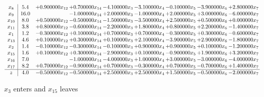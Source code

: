 \documentclass[10pt]{article}
\begin{document}
 \[\begin{array}{c| c c@{\hskip 2pt} c@{\hskip 2pt} c@{\hskip 2pt} c@{\hskip 2pt} c@{\hskip 2pt} c@{\hskip 2pt} c@{\hskip 2pt} }
 x_{8}   &  5.4 & + 0.900000 x_{12} & + 0.700000 x_{14} & -4.100000 x_{3} & -3.100000 x_{4} & -0.100000 x_{5} & -3.900000 x_{6} & + 2.800000 x_{7}\\
 x_{9}   &  16.0  &   & -1.000000 x_{14} & + 2.000000 x_{3} & -1.000000 x_{4} & + 2.000000 x_{5} & + 3.000000 x_{6} & -6.000000 x_{7}\\
 x_{10}   &  8.0 & + 0.500000 x_{12} & -0.500000 x_{14} & -1.500000 x_{3} & -3.500000 x_{4} & + 2.500000 x_{5} & + 0.500000 x_{6} & + 0.000000 x_{7}\\
 x_{11}   &  3.8 & + 0.800000 x_{12} & -0.600000 x_{14} & -2.200000 x_{3} & + 1.800000 x_{4} & + 0.800000 x_{5} & + 2.200000 x_{6} & -1.400000 x_{7}\\
 x_{1}   &  1.2 & -0.300000 x_{12} & + 0.100000 x_{14} & + 0.700000 x_{3} & + 0.700000 x_{4} & -0.300000 x_{5} & + 0.300000 x_{6} & -0.600000 x_{7}\\
 x_{13}   &  4.6 & + 0.100000 x_{12} & + 0.300000 x_{14} & + 0.100000 x_{3} & + 2.100000 x_{4} & -3.900000 x_{5} & + 2.900000 x_{6} & -1.800000 x_{7}\\
 x_{2}   &  1.4 & -0.100000 x_{12} & -0.300000 x_{14} & -0.100000 x_{3} & + 0.900000 x_{4} & + 0.900000 x_{5} & + 0.100000 x_{6} & -1.200000 x_{7}\\
 x_{15}   &  1.6 & + 0.100000 x_{12} & + 0.300000 x_{14} & -2.900000 x_{3} & + 0.100000 x_{4} & -0.900000 x_{5} & + 1.900000 x_{6} & + 3.200000 x_{7}\\
 x_{16}   &  7.0  &   & -1.000000 x_{14} & -4.000000 x_{3} & + 1.000000 x_{4} & + 3.000000 x_{5} & -3.000000 x_{6} & -4.000000 x_{7}\\
 x_{17}   &  8.2 & + 0.700000 x_{12} & -0.900000 x_{14} & + 0.700000 x_{3} & -0.300000 x_{4} & + 0.700000 x_{5} & -0.700000 x_{6} & + 1.400000 x_{7}\\
\hline
z    &  4.0 & -0.500000 x_{12} & -0.500000 x_{14} & + 2.500000 x_{3} & + 2.500000 x_{4} & + 1.500000 x_{5} & -0.500000 x_{6} & -2.000000 x_{7}\\
\end{array}\]


 $ x_{3} $ enters and $ x_{15} $ leaves 
\end{document}
